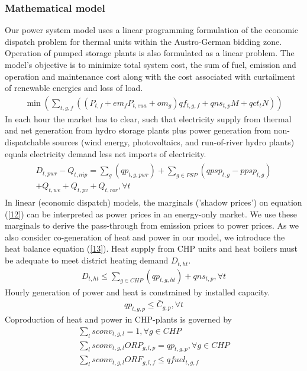 \documentclass[preprint, 12pt, authoryear]{elsarticle}
\begin{document}
\subsubsection{Mathematical model}
Our power system model uses a linear programming formulation of the economic dispatch problem for thermal units within the Austro-German bidding zone. Operation of pumped storage plants is also formulated as a linear problem.
The model's objective is to minimize total system cost, the sum of fuel, emission and operation and maintenance cost along with the cost associated with curtailment of renewable energies and loss of load.
\begin{align}
\min \left(\sum_{t,g,f}\left(\left(P_{t,f} + em_{f} P_{t,eua}+om_{g}\right) qf_{t,g,f} + qns_{t,p} M + qct_{t} N \right) \right)
\end{align}
In each hour the market has to clear, such that electricity supply from thermal and net generation from hydro storage plants plus power generation from non-dispatchable sources (wind energy, photovoltaics, and run-of-river hydro plants) equals electricity demand less net imports of electricity.
\begin{align}\label{12}
\begin{split}
D_{t,pwr} - Q_{t,nip} = \sum_{g} \left(q p_{t,g,pwr} \right) + \sum_{g\in PSP} \left(qpsp_{t,g} - ppsp_{t,g} \right) \\
+ Q_{t,we} + Q_{t,pv} + Q_{t,ror}, \forall t
\end{split}
\end{align}
In linear (economic dispatch) models, the marginals ('shadow prices') on equation (\ref{12}) can be interpreted as power prices in an energy-only market. We use these marginals to derive the pass-through from emission prices to power prices.
As we also consider co-generation of heat and power in our model, we introduce the heat balance equation (\ref{13}). Heat supply from CHP units and heat boilers must be adequate to meet district heating demand $D_{t,ht}$.
\begin{align}\label{13}
D_{t,ht} \leq \sum_{g \in CHP} \left( qp_{t,g,ht} \right) + qns_{t,p}, \forall t
\end{align}
Hourly generation of power and heat is constrained by installed capacity. 
\begin{align}
qp_{t,g,p} \leq \bar{C}_{g,p}, \forall t
\end{align}
Coproduction of heat and power in CHP-plants is governed by
\begin{align}
\sum_{l} sconv_{t,g,l} = 1, \forall g \in CHP \\
\sum_{l} sconv_{t,g,l} ORP_{g,l,p} = qp_{t,g,p}, \forall g \in CHP \\
\sum_{l} sconv_{t,g,l} ORF_{g,l,f} \leq qfuel_{t,g,f}
\end{align}
\end{document}
